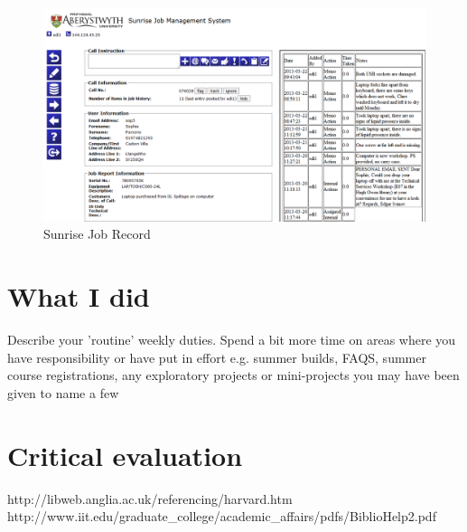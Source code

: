 \documentclass[10pt,a4paper,headinclude=true]{report}
\begin{document}
\begin{figure}[H]
\centering
\centerline{\includegraphics[scale=0.5]{./sunrise_job}}
\caption{Sunrise Job Record}
\label{fig:sunrise_job}
\end{figure}

\chapter{What I did}
Describe your 'routine' weekly duties. Spend a bit more time on areas where you have
responsibility or have put in effort e.g. summer builds, FAQS, summer course
registrations, any exploratory projects or mini-projects you may have been given to
name a few \cite{notes}

\chapter{Critical evaluation}

http://libweb.anglia.ac.uk/referencing/harvard.htm
http://www.iit.edu/graduate_college/academic_affairs/pdfs/BiblioHelp2.pdf
\end{document}

